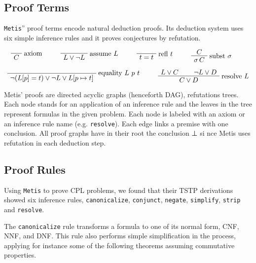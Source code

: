 \documentclass[runningheads,a4paper]{llncs}
\newenvironment{bprooftree}
  {\leavevmode\hbox\bgroup}
  {\DisplayProof\egroup}
\begin{document}
\subsection{Proof Terms}

\verb!Metis!'' proof terms encode natural deduction proofs. Its deduction system uses six simple inference rules and it proves conjectures by refutation.

\[
\begin{bprooftree}
\AxiomC{}
\RightLabel{axiom}
\UnaryInfC{$C$}
\end{bprooftree}
\qquad
\begin{bprooftree}
\AxiomC{}
\RightLabel{assume $L$}
\UnaryInfC{$L \vee \neg L$}
\end{bprooftree}
\qquad
\begin{bprooftree}
\AxiomC{}
\RightLabel{refl $t$}
\UnaryInfC{$t = t$}
\end{bprooftree}
\qquad
\begin{bprooftree}
\AxiomC{$C$}
\RightLabel{subst $\sigma$}
\UnaryInfC{$\sigma\,C$}
\end{bprooftree}
\qquad
\]

\[
\begin{bprooftree}
\AxiomC{}
\RightLabel{equality $L$ $p$ $t$}
\UnaryInfC{$\neg (L[p] = t) \vee \neg L \vee L[ p \mapsto t]$}
\end{bprooftree}
\qquad
\begin{bprooftree}
\AxiomC{$L \vee C$}
\AxiomC{$\neg L \vee D$}
\RightLabel{resolve $L$}
\BinaryInfC{$C \vee D$}
\end{bprooftree}
\]

Metis’ proofs are directed acyclic graphs (henceforth DAG), refutations trees. Each node stands for an application of an inference rule and the leaves in the tree represent formulas in the given problem. Each node is labeled with an axiom or an inference rule name (e.g. \verb!resolve!). Each edge links a premise with one conclusion. All proof graphs have in their root the conclusion ⊥ si
nce Metis uses refutation in each deduction step.


\subsection{Proof Rules}
Using \verb!Metis! to prove CPL problems, we found that their TSTP derivations showed six inference rules, \verb!canonicalize!, \verb!conjunct!, \verb!negate!, \verb!simplify!,  \verb!strip! and \verb!resolve!.

The \verb!canonicalize! rule transforms a formula to one of its normal form, CNF, NNF, and DNF.
This rule also performs simple simplification in the process, applying for instance some of the following theorems assuming commutative properties.
\end{document}
